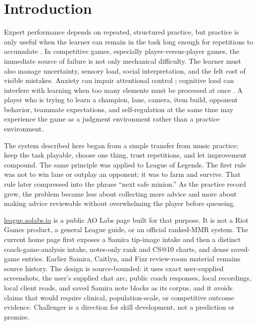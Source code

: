 \documentclass[12pt,letterpaper]{article}
\begin{document}
\newpage
\pagestyle{fancy}

\section{Introduction}

Expert performance depends on repeated, structured practice, but practice is only useful when the learner can remain in the task long enough for repetitions to accumulate \cite{ericsson1993}. In competitive games, especially player-versus-player games, the immediate source of failure is not only mechanical difficulty. The learner must also manage uncertainty, sensory load, social interpretation, and the felt cost of visible mistakes. Anxiety can impair attentional control \cite{eysenck2007}; cognitive load can interfere with learning when too many elements must be processed at once \cite{sweller1988}. A player who is trying to learn a champion, lane, camera, item build, opponent behavior, teammate expectations, and self-regulation at the same time may experience the game as a judgment environment rather than a practice environment.

The system described here began from a simple transfer from music practice: keep the task playable, choose one thing, trust repetitions, and let improvement compound. The same principle was applied to League of Legends. The first rule was not to win lane or outplay an opponent; it was to farm and survive. That rule later compressed into the phrase ``next safe minion.'' As the practice record grew, the problem became less about collecting more advice and more about making advice reviewable without overwhelming the player before queueing.

\href{https://league.aolabs.io}{league.aolabs.io} is a public AO Labs page built for that purpose. It is not a Riot Games product, a general League guide, or an official ranked-MMR system. The current home page first exposes a Samira tip-image intake and then a distinct coach-game-analysis intake, notes-only rank and CS@10 charts, and dense saved-game entries. Earlier Samira, Caitlyn, and Fizz review-room material remains source history. The design is source-bounded: it uses exact user-supplied screenshots, the user's supplied chat arc, public coach responses, local recordings, local client reads, and saved Samira note blocks as its corpus, and it avoids claims that would require clinical, population-scale, or competitive outcome evidence. Challenger is a direction for skill development, not a prediction or promise.
\end{document}
